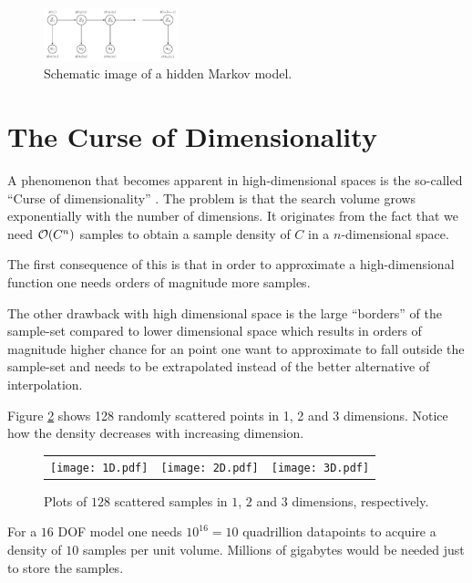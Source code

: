 \begin{figure}
  \centering
  \includegraphics[width=0.35\textwidth]{hmm-graph.pdf}
  \caption{Schematic image of a hidden Markov model.}
  \label{fig:hmm-graph}
\end{figure}


\section{The Curse of Dimensionality} A phenomenon that becomes
apparent in high-dimensional spaces is the so-called ``Curse of
dimensionality'' \cite{EncyclopediaMachineLearning}.  The problem is
that the search volume grows exponentially with the number of
dimensions.  It originates from the fact that we need $\mathcal{O}{\left(C^n\right)}$
samples to obtain a sample density of $C$ in a $n$-dimensional space.

The first consequence of this is that in order to approximate a
high-dimensional function one needs orders of magnitude more samples.

The other drawback with high dimensional space is the large
``borders'' of the sample-set compared to lower dimensional space
which results in orders of magnitude higher chance for an point one
want to approximate to fall outside the sample-set and needs to be
extrapolated instead of the better alternative of interpolation.

\begin{example} Figure \ref{fig:curse-of-dimensionality} shows 128
randomly scattered points in 1, 2 and 3 dimensions. Notice how the
density decreases with increasing dimension.
  \begin{figure}
    \begin{tabular}{rcl}
      \texttt{[image: 1D.pdf]}&
      \texttt{[image: 2D.pdf]}&
      \texttt{[image: 3D.pdf]}
    \end{tabular}
    \caption{Plots of $128$ scattered samples in $1$, $2$ and $3$
dimensions, respectively.}
    \label{fig:curse-of-dimensionality}
  \end{figure}
\end{example}

\begin{example} For a $16$ DOF model one needs $10^{16}=10$
quadrillion datapoints to acquire a density of $10$ samples per unit
volume. Millions of gigabytes would be needed just to store the
samples.
\end{example}

